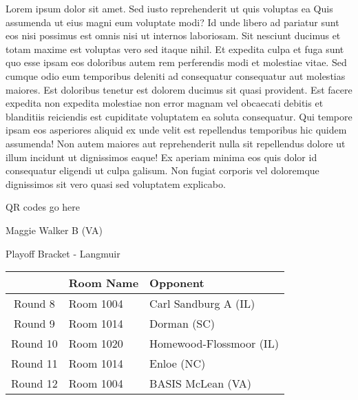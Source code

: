 \documentclass{article}%
\begin{document}
\vspace*{8pt}%
\linebreak%
\newline%
\newline%
Lorem ipsum dolor sit amet. Sed iusto reprehenderit ut quis voluptas ea Quis assumenda ut eius magni eum voluptate modi? Id unde libero ad pariatur sunt eos nisi possimus est omnis nisi ut internos laboriosam. Sit nesciunt ducimus et totam maxime est voluptas vero sed itaque nihil. Et expedita culpa et fuga sunt quo esse ipsam eos doloribus autem rem perferendis modi et molestiae vitae.\newline%
\newline%
Sed cumque odio eum temporibus deleniti ad consequatur consequatur aut molestias maiores. Est doloribus tenetur est dolorem ducimus sit quasi provident. Est facere expedita non expedita molestiae non error magnam vel obcaecati debitis et blanditiis reiciendis est cupiditate voluptatem ea soluta consequatur. Qui tempore ipsam eos asperiores aliquid ex unde velit est repellendus temporibus hic quidem assumenda!\newline%
\newline%
Non autem maiores aut reprehenderit nulla sit repellendus dolore ut illum incidunt ut dignissimos eaque! Ex aperiam minima eos quis dolor id consequatur eligendi ut culpa galisum. Non fugiat corporis vel doloremque dignissimos sit vero quasi sed voluptatem explicabo.\newline%
\newline%
%
\vspace*{30pt}%
\begin{center}%
\begin{Huge}%
QR codes go here%
\end{Huge}%
\end{center}%
\newpage%
\begin{center}%
\begin{Huge}%
Maggie Walker B (VA)%
\end{Huge}%
\vspace*{8pt}%
\linebreak%
\begin{Large}%
Playoff Bracket {-} Langmuir%
\end{Large}%
\end{center}%
%
\begin{tabularx}{\textwidth}{|c|Y|Y|}%
\hline%
&Room Name&Opponent\\%
\hline%
Round 8&Room 1004&Carl Sandburg A (IL)\\%
Round 9&Room 1014&Dorman (SC)\\%
Round 10&Room 1020&Homewood{-}Flossmoor (IL)\\%
Round 11&Room 1014&Enloe (NC)\\%
Round 12&Room 1004&BASIS McLean (VA)\\%
\hline%
\end{tabularx}%
\end{document}

